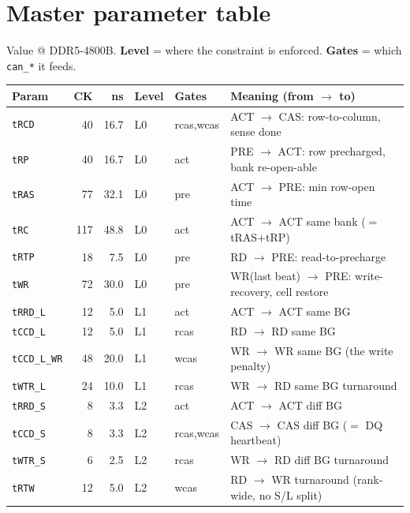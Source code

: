 \documentclass[10pt]{article}
\newcommand{\p}[1]{\texttt{#1}}
\begin{document}
\section{Master parameter table}
Value @ DDR5-4800B. \textbf{Level} = where the constraint is enforced.
\textbf{Gates} = which \p{can\_*} it feeds.

\begin{longtable}{@{}l r r l l p{6.1cm}@{}}
\toprule
\textbf{Param} & \textbf{CK} & \textbf{ns} & \textbf{Level} & \textbf{Gates} & \textbf{Meaning (from $\rightarrow$ to)} \\
\midrule
\endhead
\p{tRCD}      & 40  & 16.7 & \cellcolor{l0}L0 & rcas,wcas & ACT $\rightarrow$ CAS: row-to-column, sense done \\
\p{tRP}       & 40  & 16.7 & \cellcolor{l0}L0 & act       & PRE $\rightarrow$ ACT: row precharged, bank re-open-able \\
\p{tRAS}      & 77  & 32.1 & \cellcolor{l0}L0 & pre       & ACT $\rightarrow$ PRE: min row-open time \\
\p{tRC}       & 117 & 48.8 & \cellcolor{l0}L0 & act       & ACT $\rightarrow$ ACT same bank ($=$tRAS+tRP) \\
\p{tRTP}      & 18  & 7.5  & \cellcolor{l0}L0 & pre       & RD $\rightarrow$ PRE: read-to-precharge \\
\p{tWR}       & 72  & 30.0 & \cellcolor{l0}L0 & pre       & WR(last beat) $\rightarrow$ PRE: write-recovery, cell restore \\
\p{tRRD\_L}   & 12  & 5.0  & \cellcolor{l1}L1 & act       & ACT $\rightarrow$ ACT same BG \\
\p{tCCD\_L}   & 12  & 5.0  & \cellcolor{l1}L1 & rcas      & RD $\rightarrow$ RD same BG \\
\p{tCCD\_L\_WR}& 48 & 20.0 & \cellcolor{l1}L1 & wcas      & WR $\rightarrow$ WR same BG (the write penalty) \\
\p{tWTR\_L}   & 24  & 10.0 & \cellcolor{l1}L1 & rcas      & WR $\rightarrow$ RD same BG turnaround \\
\p{tRRD\_S}   & 8   & 3.3  & \cellcolor{l2}L2 & act       & ACT $\rightarrow$ ACT diff BG \\
\p{tCCD\_S}   & 8   & 3.3  & \cellcolor{l2}L2 & rcas,wcas & CAS $\rightarrow$ CAS diff BG ($=$ DQ heartbeat) \\
\p{tWTR\_S}   & 6   & 2.5  & \cellcolor{l2}L2 & rcas      & WR $\rightarrow$ RD diff BG turnaround \\
\p{tRTW}      & 12  & 5.0  & \cellcolor{l2}L2 & wcas      & RD $\rightarrow$ WR turnaround (rank-wide, no S/L split) \\

\end{longtable}
\end{document}
